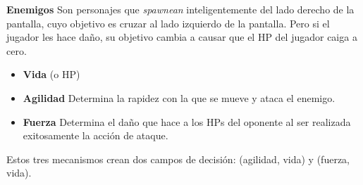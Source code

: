 \item \textbf{Enemigos} \indispensable Son personajes que \textit{spawnean} inteligentemente del lado derecho de la pantalla, cuyo objetivo es cruzar al lado izquierdo de la pantalla. Pero si el jugador les hace daño, su objetivo cambia a causar que el HP del jugador caiga a cero.

  \begin{itemize}
  \item \textbf{Vida} (o HP) \indispensable
  \item \textbf{Agilidad} \talvez Determina la rapidez con la que se mueve y ataca el enemigo.
  \item \textbf{Fuerza} \indispensable Determina el daño que hace a los HPs del oponente al ser realizada exitosamente la acción de ataque.
  \end{itemize}

  Estos tres mecanismos crean dos campos de decisión: (agilidad, vida) y (fuerza, vida).
